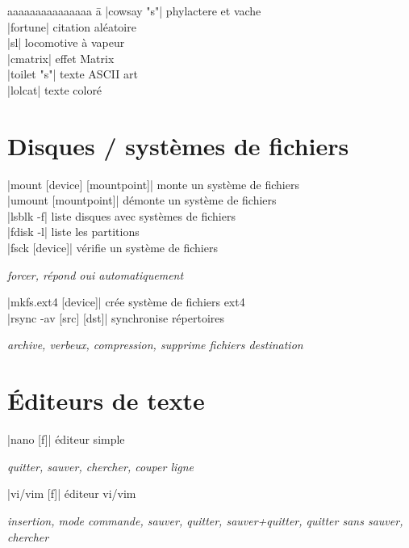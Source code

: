 \documentclass{article}
\let\oldkeys\keys
\renewcommand{\keys}[1]{\small\oldkeys{#1}\normalsize}
\newenvironment{cmdblock}{%
  \par\setlength{\parindent}{0pt}\setlength{\parskip}{0pt}%
  \RaggedRight%
}{\par}
\newlength{\cmdoptindent}
\newcommand{\cmdopt}[1]{%
  \hspace*{\cmdoptindent}%
  \begin{minipage}[t]{\dimexpr\linewidth-\cmdoptindent\relax}
    \RaggedRight \itshape #1%
  \end{minipage}\par
}
\begin{document}
\begin{multicols}{4}
    \begin{tabbing}
        aaaaaaaaaaaaaaa \= a \kill
        \code|cowsay "s"| \> phylactere et vache \\
        \code|fortune| \> citation aléatoire  \\
        \code|sl| \> locomotive à vapeur  \\
        \code|cmatrix| \> effet Matrix  \\
        \code|toilet "s"| \> texte ASCII art  \\
        \code|lolcat| \> texte coloré
    \end{tabbing}

    \section*{Disques / systèmes de fichiers}
    \begin{cmdblock}
        \code|mount [device] [mountpoint]| \quad monte un système de fichiers \\
        \code|umount [mountpoint]| \quad démonte un système de fichiers \\
        \code|lsblk -f| \quad liste disques avec systèmes de fichiers \\
        \code|fdisk -l| \quad liste les partitions \\
        \code|fsck [device]| \quad vérifie un système de fichiers \\
        \cmdopt{ forcer,  répond oui automatiquement}
        \code|mkfs.ext4 [device]| \quad crée système de fichiers ext4 \\
        \code|rsync -av [src] [dst]| \quad synchronise répertoires \\
        \cmdopt{ archive,  verbeux,  compression,
            \codx{--delete} supprime fichiers destination}
    \end{cmdblock}

    \section*{Éditeurs de texte}
    \begin{cmdblock}
        \code|nano [f]| \quad éditeur simple \\
        \cmdopt{ quitter,  sauver,
            \keys{\ctrl + W} chercher, \keys{\ctrl + K} couper ligne}
        \code|vi/vim [f]| \quad éditeur vi/vim \\
        \cmdopt{ insertion,  mode commande,
            \codx{:w} sauver, \codx{:q} quitter, \codx{:wq} sauver+quitter,
            \codx{:q!} quitter sans sauver, \codx{/text} chercher}
    \end{cmdblock}


\end{multicols}
\end{document}
